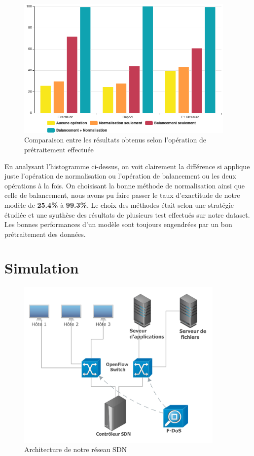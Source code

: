 \begin{figure}[h]
\centering
\includegraphics[width=0.95\textwidth]{Figures/performances}
\decoRule
\caption{Comparaison entre les résultats obtenus selon l'opération de prétraitement effectuée}
\label{fig:histogramme}
\end{figure} 
\newpage
En analysant l'histogramme ci-dessus, on voit clairement la différence si applique juste l'opération de normalisation ou l'opération de balancement ou les deux opérations à la fois. On choisisant la bonne méthode de normalisation ainsi 
que celle de balancement, nous avons pu faire passer le taux d'exactitude de notre modèle de \textbf{25.4\%} à \textbf{99.3\%}. Le choix des méthodes était selon une stratégie étudiée et  une synthèse des résultats de plusieurs test effectués sur notre dataset. Les bonnes performances d'un modèle sont toujours engendrées par un bon prétraitement des données.

\newpage
\section{Simulation}
\begin{figure}[h]
\centering
\includegraphics[width=0.9\textwidth]{Figures/simulation}
\decoRule
\caption{Architecture de notre réseau SDN}
\label{fig:architecture}
\end{figure} 
\newpage